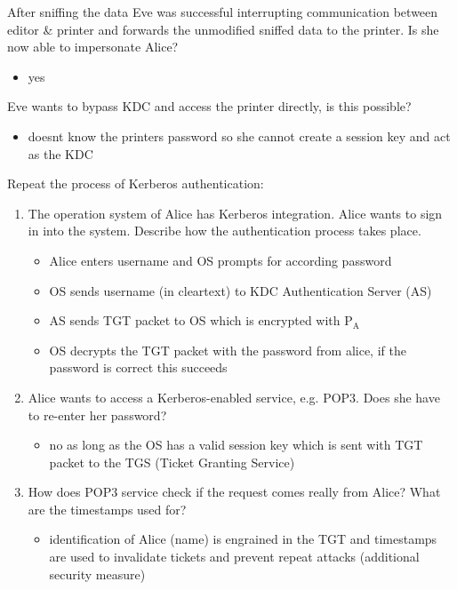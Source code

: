 \documentclass[11pt]{article}
\begin{document}
After sniffing the data Eve was successful interrupting communication between editor \& printer and forwards the unmodified sniffed data to the printer. Is she now able to impersonate Alice?
\begin{itemize}
\item yes
\end{itemize}

Eve wants to bypass KDC and access the printer directly, is this possible?
\begin{itemize}
\item doesnt know the printers password so she cannot create a session key and act as the KDC
\end{itemize}


Repeat the process of Kerberos authentication:
\begin{enumerate}
\item The operation system of Alice has Kerberos integration. Alice wants to sign in into the system. Describe how the authentication process takes place.
\begin{itemize}
\item Alice enters username and OS prompts for according password
\item OS sends username (in cleartext) to KDC Authentication Server (AS)
\item AS sends TGT packet to OS which is encrypted with P\(_{\text{A}}\)
\item OS decrypts the TGT packet with the password from alice, if the password is correct this succeeds
\end{itemize}
\item Alice wants to access a Kerberos-enabled service, e.g. POP3. Does she have to re-enter her password?
\begin{itemize}
\item no as long as the OS has a valid session key which is sent with TGT packet to the TGS (Ticket Granting Service)
\end{itemize}
\item How does POP3 service check if the request comes really from Alice? What are the timestamps used for?
\begin{itemize}
\item identification of Alice (name) is engrained in the TGT and timestamps are used to invalidate tickets and prevent repeat attacks (additional security measure)
\end{itemize}
\end{enumerate}
\end{document}
